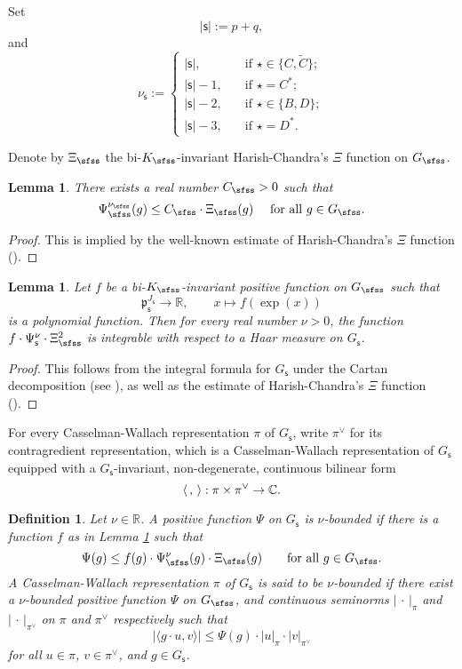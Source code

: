 \documentclass[12pt,a4paper]{amsart}
\def\abs#1{\left|{#1}\right|}
\newcommand{\p}{\mathfrak p}
\newcommand{\R}{\mathbb R}
\newcommand{\la}{\langle}
\newcommand{\ra}{\rangle}
\numberwithin{equation}{section}
\newtheorem{lem}[thm]{Lemma}
\newtheorem{defn}[thm]{Definition}
\theoremstyle{remark}
\begin{document}
Set
\[
\abs{\mathsf s}:=p+q,
\]
 and
\[
  \nu_\mathsf s:=\begin{cases}
    \abs{\mathsf s},\quad &\textrm{if }\star\in \{C, \widetilde C\};\\
     \abs{\mathsf s}-1,\quad & \textrm{if }\star= C^*;\\
      \abs{\mathsf s}-2,\quad & \textrm{if }\star\in \{B,D\};\\
       \abs{\mathsf s}-3,\quad & \textrm{if }\star= D^*.
  \end{cases}
\]

Denote by $\Xi_\sfss$ the bi-$K_\sfss$-invariant Harish-Chandra's $\Xi$ function on $G_\sfss$.

\begin{lem}\label{boundpsi}
There exists a real number $C_\sfss>0$ such that
\[
  \Psi_\sfss^{\nu_\sfss}(g)\leq C_\sfss\cdot \Xi_\sfss (g)\quad\textrm{ for all $g\in G_\sfss$}.
\]

\end{lem}
\begin{proof}
This is implied by the well-known  estimate of Harish-Chandra's $\Xi$ function (\cite[Theorem 4.5.3]{Wa1}).
\end{proof}



\begin{lem}\label{int}
Let $f$ be a bi-$K_\sfss$-invariant positive function  on $G_\sfss$  such that
\[
  \p_\mathsf s^{J_\mathsf s}\rightarrow \R, \qquad x\mapsto f(\exp(x))
\]
is a polynomial function. Then for every real number $\nu>0$, the function $f\cdot \Psi_\mathsf s^\nu\cdot \Xi_\sfss^2$ is integrable with respect to a Haar measure on $G_\mathsf s$.
\end{lem}
\begin{proof}
  This follows from the integral formula for $G_\mathsf s$ under the Cartan decomposition (see
 \cite[Lemma 2.4.2]{Wa1}), as well as the  estimate of Harish-Chandra's $\Xi$ function (\cite[Theorem 4.5.3]{Wa1}).
\end{proof}

For every Casselman-Wallach representation $\pi$ of $G_\mathsf s$, write $\pi^\vee$ for its contragredient representation, which is a  Casselman-Wallach representation  of $G_\mathsf s$ equipped with a $G_{\mathsf s}$-invariant, non-degenerate, continuous bilinear form
 \[
   \la\,,\,\ra: \pi \times\pi^\vee\rightarrow \C.
 \]

\begin{defn}
Let $\nu\in \R$. A  positive function $\Psi$ on $G_\mathsf s$ is $\nu$-bounded if there is a  function $f$ as in Lemma \ref{int}  such that
\[
  \Psi(g)\leq f(g)\cdot \Psi_{\sfss}^\nu(g)\cdot \Xi_\sfss(g)\qquad \textrm{for all }g\in G_\sfss.
\]
A Casselman-Wallach representation $\pi$ of $G_\mathsf s$ is said to be $\nu$-bounded if there
exist a $\nu$-bounded positive function $\Psi$ on $G_\sfss$, and continuous seminorms $\abs{\,\cdot\,}_{\pi}$ and $\abs{\,\cdot\,}_{\pi^\vee}$ on  $ \pi$ and $\pi^\vee$ respectively such that
\[
 \abs{ \la g \cdot u, v\ra}\leq \Psi(g)\cdot \abs{u}_{\pi}\cdot \abs{v}_{\pi^\vee}
\]
for all $u\in \pi$, $v\in \pi^\vee$, and $g\in G_{\mathsf s}$.

\end{defn}
\end{document}
